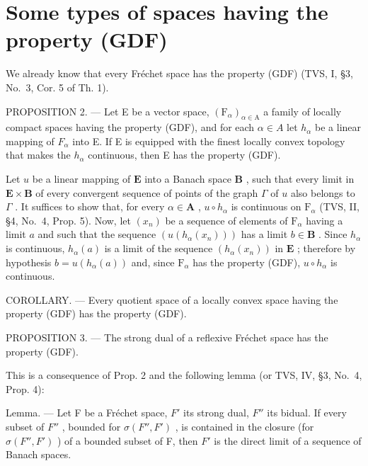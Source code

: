 \section{Some types of spaces having the property (GDF)}

We already know that every Fréchet space has the property (GDF) (TVS, I, §3, No.~3, Cor. 5 of Th. 1).

PROPOSITION 2. --- Let E be a vector space, \((\mathrm{F}_{\alpha})_{\alpha\in\mathrm{A}}\) a family of locally compact spaces having the property (GDF), and for each \(\alpha\in A\) let \(h_{\alpha}\) be a linear mapping of \(F_{\alpha}\) into E. If E is equipped with the finest locally convex topology that makes the \(h_{\alpha}\) continuous, then E has the property (GDF).

Let \(u\) be a linear mapping of \(\mathbf{E}\) into a Banach space \(\mathbf{B}\) , such that every limit in \(\mathbf{E} \times \mathbf{B}\) of every convergent sequence of points of the graph \(\Gamma\) of \(u\) also belongs to \(\Gamma\) . It suffices to show that, for every \(\alpha \in \mathbf{A}\) , \(u \circ h_{\alpha}\) is continuous on \(\mathrm{F}_{\alpha}\) (TVS, II, §4, No.~4, Prop. 5). Now, let \((x_n)\) be a sequence of elements of \(\mathrm{F}_{\alpha}\) having a limit \(a\) and such that the sequence \(\left(u(h_{\alpha}(x_n))\right)\) has a limit \(b \in \mathbf{B}\) . Since \(h_{\alpha}\) is continuous, \(h_{\alpha}(a)\) is a limit of the sequence \((h_{\alpha}(x_n))\) in \(\mathbf{E}\) ; therefore by hypothesis \(b = u(h_{\alpha}(a))\) and, since \(\mathrm{F}_{\alpha}\) has the property (GDF), \(u \circ h_{\alpha}\) is continuous.

COROLLARY. --- Every quotient space of a locally convex space having the property (GDF) has the property (GDF).

PROPOSITION 3. --- The strong dual of a reflexive Fréchet space has the property (GDF).

This is a consequence of Prop. 2 and the following lemma (or TVS, IV, §3, No.~4, Prop. 4):

Lemma. --- Let F be a Fréchet space, \(F'\) its strong dual, \(F''\) its bidual. If every subset of \(F''\) , bounded for \(\sigma(F'', F')\) , is contained in the closure (for \(\sigma(F'', F')\) ) of a bounded subset of F, then \(F'\) is the direct limit of a sequence of Banach spaces.


